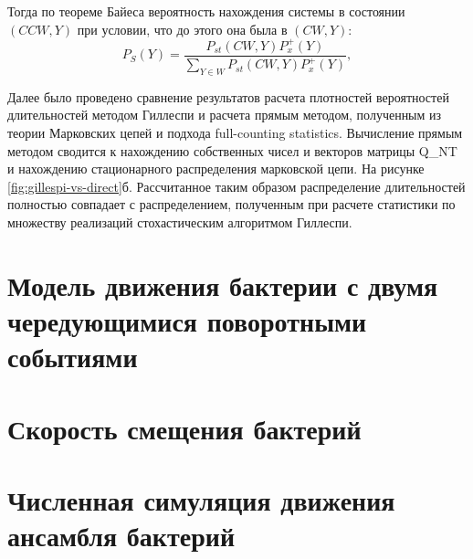 Тогда по теореме Байеса вероятность нахождения системы в состоянии $(CCW, Y)$ при условии, что до этого она была в $(CW, Y)$:
\begin{equation}
    P_S(Y)=\frac{P_{st}(CW, Y) P_x^+(Y)}{\sum_{Y\in W} P_{st}(CW, Y) P_x^+(Y)},
    \label{eq:start-prob-solution}
\end{equation}

Далее было проведено сравнение результатов расчета плотностей вероятностей длительностей методом Гиллеспи и расчета прямым методом, полученным из теории Марковских цепей и подхода full-counting statistics. 
Вычисление прямым методом сводится к нахождению собственных чисел и векторов матрицы Q_{NT} и нахождению стационарного распределения марковской цепи. На рисунке \cref{fig:gillespi-vs-direct}б. Рассчитанное таким образом распределение длительностей полностью совпадает с распределением, полученным при расчете статистики по множеству реализаций стохастическим алгоритмом Гиллеспи.

\section{Модель движения бактерии с двумя чередующимися поворотными событиями}\label{sec:ch2/sec2}
\section{Скорость смещения бактерий}\label{sec:ch2/sec3}
\section{Численная симуляция движения ансамбля бактерий}\label{sec:ch2/sec4}

